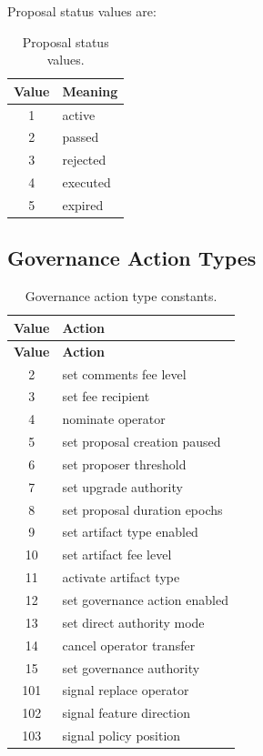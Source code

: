 \documentclass[11pt]{article}
\begin{document}
Proposal status values are:

\begin{table}[htbp]
\centering
\caption{Proposal status values.}
\begin{tabular}{cl}
\toprule
\textbf{Value} & \textbf{Meaning} \\
\midrule
1 & active \\
2 & passed \\
3 & rejected \\
4 & executed \\
5 & expired \\
\bottomrule
\end{tabular}
\end{table}

\subsection{Governance Action Types}

\begin{longtable}{cl}
\caption{Governance action type constants.}
\label{tab:governance-actions}\\
\toprule
\textbf{Value} & \textbf{Action} \\
\midrule
\endfirsthead
\toprule
\textbf{Value} & \textbf{Action} \\
\midrule
\endhead
2 & set comments fee level \\
3 & set fee recipient \\
4 & nominate operator \\
5 & set proposal creation paused \\
6 & set proposer threshold \\
7 & set upgrade authority \\
8 & set proposal duration epochs \\
9 & set artifact type enabled \\
10 & set artifact fee level \\
11 & activate artifact type \\
12 & set governance action enabled \\
13 & set direct authority mode \\
14 & cancel operator transfer \\
15 & set governance authority \\
101 & signal replace operator \\
102 & signal feature direction \\
103 & signal policy position \\
\bottomrule
\end{longtable}
\end{document}
